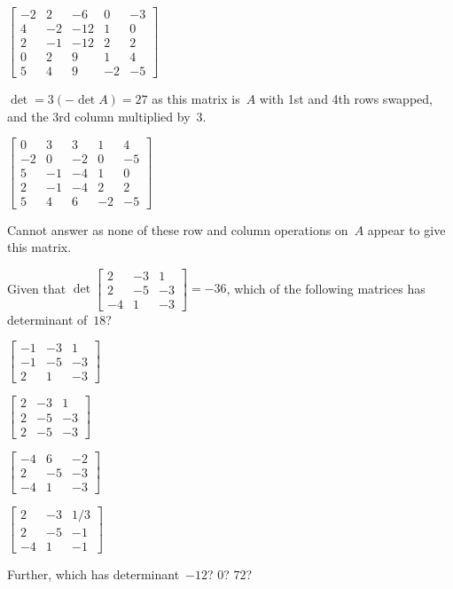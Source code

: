 \begin{example}
\begin{parts}
\item \(\begin{bmatrix}-2&2&-6&0&-3
\\4&-2&-12&1&0
\\2&-1&-12&2&2
\\0&2&9&1&4
\\5&4&9&-2&-5\end{bmatrix}\)
\begin{solution} 
\(\det=3(-\det A)=27\) as this matrix is~\(A\) with 1st and 4th rows swapped, and the 3rd column multiplied by~\(3\). 
\end{solution}

\item \(\begin{bmatrix}0&3&3&1&4
\\-2&0&-2&0&-5
\\5&-1&-4&1&0
\\2&-1&-4&2&2
\\5&4&6&-2&-5\end{bmatrix}\)
\begin{solution} 
Cannot answer as none of these row and column operations on~\(A\) appear to give this matrix.
\end{solution}

\end{parts}
\end{example}




\begin{activity}
Given that \(\det\begin{bmatrix} 2&-3&1
\\2&-5&-3
\\-4&1&-3 \end{bmatrix}=-36\), which of the following matrices has determinant of~\(18\)?
\begin{parts}
\item \(\begin{bmatrix} -1&-3&1
\\-1&-5&-3
\\2&1&-3 \end{bmatrix}\)  \actans
\item \(\begin{bmatrix} 2&-3&1
\\2&-5&-3
\\2&-5&-3 \end{bmatrix}\)
\item \(\begin{bmatrix} -4&6&-2
\\2&-5&-3
\\-4&1&-3 \end{bmatrix}\)
\item \(\begin{bmatrix} 2&-3&1/3
\\2&-5&-1
\\-4&1&-1 \end{bmatrix}\)
\end{parts}
Further, which has determinant~\(-12\)? \(0\)? \(72\)?
\end{activity}



